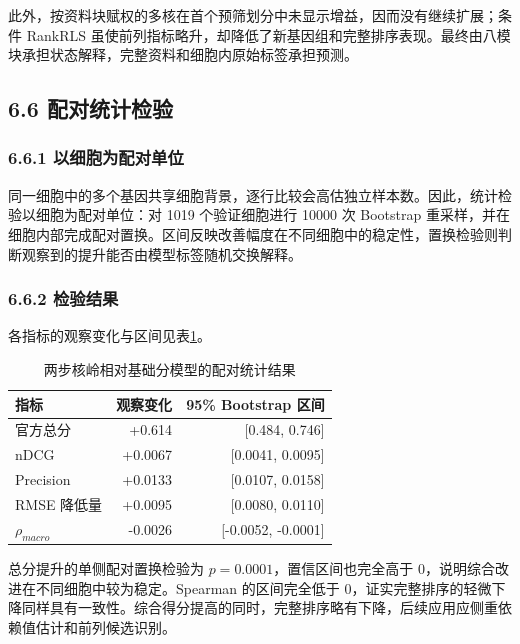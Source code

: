 此外，按资料块赋权的多核在首个预筛划分中未显示增益，因而没有继续扩展；条件 RankRLS 虽使前列指标略升，却降低了新基因组和完整排序表现\cite{ref13,ref14}。最终由八模块承担状态解释，完整资料和细胞内原始标签承担预测。

\hypertarget{66-ux914dux5bf9ux7edfux8ba1ux68c0ux9a8c}{%
\subsection{6.6 配对统计检验}\label{66-ux914dux5bf9ux7edfux8ba1ux68c0ux9a8c}}

\hypertarget{661-ux4ee5ux7ec6ux80deux4e3aux914dux5bf9ux5355ux4f4d}{%
\subsubsection{6.6.1 以细胞为配对单位}\label{661-ux4ee5ux7ec6ux80deux4e3aux914dux5bf9ux5355ux4f4d}}

同一细胞中的多个基因共享细胞背景，逐行比较会高估独立样本数。因此，统计检验以细胞为配对单位：对 1019 个验证细胞进行 10000 次 Bootstrap 重采样，并在细胞内部完成配对置换。区间反映改善幅度在不同细胞中的稳定性，置换检验则判断观察到的提升能否由模型标签随机交换解释\cite{ref15}。

\hypertarget{662-ux68c0ux9a8cux7ed3ux679c}{%
\subsubsection{6.6.2 检验结果}\label{662-ux68c0ux9a8cux7ed3ux679c}}

各指标的观察变化与区间见表\ref{tab:paired-tests}。

\begin{longtable}[]{@{}lrr@{}}
\caption{两步核岭相对基础分模型的配对统计结果}\label{tab:paired-tests}\\
\toprule
指标 & 观察变化 & 95\% Bootstrap 区间 \\
\midrule
\endhead
官方总分 & +0.614 & {[}0.484, 0.746{]} \\
nDCG & +0.0067 & {[}0.0041, 0.0095{]} \\
Precision & +0.0133 & {[}0.0107, 0.0158{]} \\
RMSE 降低量 & +0.0095 & {[}0.0080, 0.0110{]} \\
\(\rho_{macro}\) & -0.0026 & {[}-0.0052, -0.0001{]} \\
\bottomrule
\end{longtable}

总分提升的单侧配对置换检验为 \(p=0.0001\)，置信区间也完全高于 0，说明综合改进在不同细胞中较为稳定。Spearman 的区间完全低于 0，证实完整排序的轻微下降同样具有一致性。综合得分提高的同时，完整排序略有下降，后续应用应侧重依赖值估计和前列候选识别。

